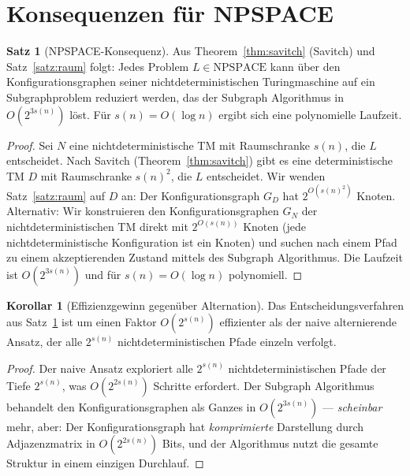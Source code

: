 ﻿\documentclass[a4paper,12pt]{article}
\theoremstyle{definition}
\newtheorem{satz}{Satz}
\newtheorem{korollar}{Korollar}
\begin{document}
\section{Konsequenzen für NPSPACE}
\label{sec:npspace}

\begin{satz}[NPSPACE-Konsequenz]
\label{satz:npspace}
  Aus Theorem~\ref{thm:savitch} (Savitch) und Satz~\ref{satz:raum} folgt:
  Jedes Problem $L \in \mathrm{NPSPACE}$ kann über den Konfigurationsgraphen
  seiner nichtdeterministischen Turingmaschine auf ein Subgraphproblem reduziert
  werden, das der Subgraph Algorithmus in $O(2^{3s(n)})$ löst.
  Für $s(n) = O(\log n)$ ergibt sich eine polynomielle Laufzeit.
\end{satz}

\begin{proof}
  Sei $N$ eine nichtdeterministische TM mit Raumschranke $s(n)$, die $L$ entscheidet.
  Nach Savitch (Theorem~\ref{thm:savitch}) gibt es eine deterministische TM $D$ mit
  Raumschranke $s(n)^2$, die $L$ entscheidet.
  Wir wenden Satz~\ref{satz:raum} auf $D$ an: Der Konfigurationsgraph $G_D$
  hat $2^{O(s(n)^2)}$ Knoten.
  Alternativ: Wir konstruieren den Konfigurationsgraphen $G_N$ der nichtdeterministischen
  TM direkt mit $2^{O(s(n))}$ Knoten (jede nichtdeterministische Konfiguration ist ein Knoten)
  und suchen nach einem Pfad zu einem akzeptierenden Zustand mittels des Subgraph Algorithmus.
  Die Laufzeit ist $O(2^{3s(n)})$ und für $s(n) = O(\log n)$ polynomiell.
\end{proof}

\begin{korollar}[Effizienzgewinn gegenüber Alternation]
  Das Entscheidungsverfahren aus Satz~\ref{satz:npspace} ist um einen Faktor
  $O(2^{s(n)})$ effizienter als der naive alternierende Ansatz,
  der alle $2^{s(n)}$ nichtdeterministischen Pfade einzeln verfolgt.
\end{korollar}

\begin{proof}
  Der naive Ansatz exploriert alle $2^{s(n)}$ nichtdeterministischen Pfade
  der Tiefe $2^{s(n)}$, was $O(2^{2s(n)})$ Schritte erfordert.
  Der Subgraph Algorithmus behandelt den Konfigurationsgraphen als Ganzes
  in $O(2^{3s(n)})$ --- \textit{scheinbar} mehr, aber: Der Konfigurationsgraph
  hat \emph{komprimierte} Darstellung durch Adjazenzmatrix in $O(2^{2s(n)})$ Bits,
  und der Algorithmus nutzt die gesamte Struktur in einem einzigen Durchlauf.
\end{proof}
\end{document}
